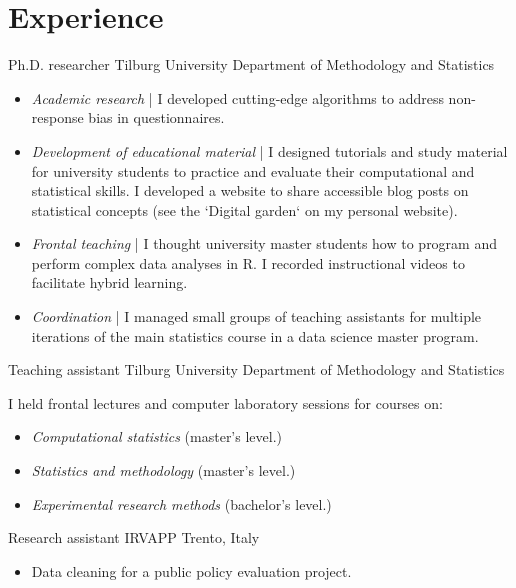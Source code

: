 \section{Experience}

{Ph.D. researcher}
{Tilburg University} %
{} %
{Department of Methodology and Statistics}   %
{
    \begin{itemize}
        \item \textit{Academic research} | I developed cutting-edge algorithms to address non-response bias in questionnaires.
        \item \textit{Development of educational material} | I designed tutorials and study material for university students to practice and evaluate their computational and statistical skills. I developed a website to share accessible blog posts on statistical concepts (see the `Digital garden` on my personal website).
        \item \textit{Frontal teaching} | I thought university master students how to program and perform complex data analyses in R. I recorded instructional videos to facilitate hybrid learning.
        \item \textit{Coordination} | I managed small groups of teaching assistants for multiple iterations of the main statistics course in a data science master program.
    \end{itemize}
}

{Teaching assistant}
{Tilburg University} %
{} %
{Department of Methodology and Statistics}   %
{
    I held frontal lectures and computer laboratory sessions for courses on:
    \begin{itemize}
        \item \textit{Computational statistics} (master's level.)
		\item \textit{Statistics and methodology} (master's level.)
		\item \textit{Experimental research methods} (bachelor's level.)
    \end{itemize}
}

{Research assistant}
{IRVAPP} %
{Trento, Italy} %
{}   %
{
    \begin{itemize}
        \item Data cleaning for a public policy evaluation project.
    \end{itemize}
}

